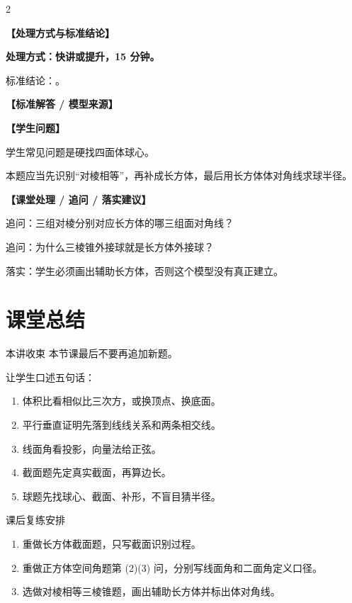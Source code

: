 \documentclass[11pt,a4paper]{ctexart}
\newcommand{\teachblock}[2]{%
  \par\addvspace{0.55em}%
  \noindent\textbf{【#1】}\par\nobreak
  \begingroup
    \raggedright
    \setlength{\parskip}{0.35em}%
    #2\par
  \endgroup
}
\newcommand{\topicteacherproblem}[2]{%
  \teachquestionheader{#1\quad #2}
}
\begin{document}
\newpage

\topicteacherproblem{提升}{对棱相等三棱锥与外接球}
{\small \qSolidIsoscelesTetrahedronStem}
\begin{center}
  \qSolidIsoscelesTetrahedronFigure[1.1]
\end{center}

\begin{paracol}{2}
\teachblock{处理方式与标准结论}{
  \textbf{处理方式：快讲或提升，15 分钟。}

  标准结论：\qSolidIsoscelesTetrahedronAnswer。
}

\teachblock{标准解答 / 模型来源}{
  \qSolidIsoscelesTetrahedronSolution
}

\switchcolumn
\teachblock{学生问题}{
  \qSolidIsoscelesTetrahedronDiagnosis

  学生常见问题是硬找四面体球心。

  本题应当先识别“对棱相等”，再补成长方体，最后用长方体体对角线求球半径。
}

\teachblock{课堂处理 / 追问 / 落实建议}{
  \begin{itemize}[leftmargin=1.5em]
    \qSolidIsoscelesTetrahedronTeachingNotes
  \end{itemize}

  追问：三组对棱分别对应长方体的哪三组面对角线？

  追问：为什么三棱锥外接球就是长方体外接球？

  落实：学生必须画出辅助长方体，否则这个模型没有真正建立。
}
\end{paracol}

\section{课堂总结}

\begin{teachbox}{本讲收束}
本节课最后不要再追加新题。

让学生口述五句话：
\begin{enumerate}[label=\arabic*. , leftmargin=2em, itemsep=0.25em]
  \item 体积比看相似比三次方，或换顶点、换底面。
  \item 平行垂直证明先落到线线关系和两条相交线。
  \item 线面角看投影，向量法给正弦。
  \item 截面题先定真实截面，再算边长。
  \item 球题先找球心、截面、补形，不盲目猜半径。
\end{enumerate}
\end{teachbox}

\begin{teachbox}{课后复练安排}
\begin{enumerate}[label=\arabic*. , leftmargin=2em, itemsep=0.25em]
  \item 重做长方体截面题，只写截面识别过程。
  \item 重做正方体空间角题第 (2)(3) 问，分别写线面角和二面角定义口径。
  \item 选做对棱相等三棱锥题，画出辅助长方体并标出体对角线。
\end{enumerate}
\end{teachbox}
\end{document}
